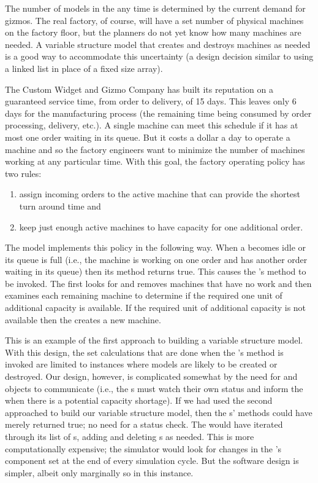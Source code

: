 The number of  models in the  any time is determined by the current demand for gizmos. The real factory, of course, will have a set number of physical machines on the factory floor, but the planners do not yet know how many machines are needed. A variable structure model that creates and destroys machines as needed is a good way to accommodate this uncertainty (a design decision similar to using a linked list in place of a fixed size array). 

The Custom Widget and Gizmo Company has built its reputation on a guaranteed service time, from order to delivery, of 15 days. This leaves only 6 days for the manufacturing process (the remaining time being consumed by order processing, delivery, etc.). 
A single machine can meet this schedule if it has at most one order waiting in its queue. But it costs a dollar a day to operate a machine and so the factory engineers want to minimize the number of machines working at any particular time. With this goal, the factory operating policy has two rules:
\begin{enumerate}
\item assign incoming orders to the active machine that can provide the shortest turn around time and
\item keep just enough active machines to have capacity for one additional order.
\end{enumerate}
The  model implements this policy in the following way. When a  becomes idle or its queue is full (i.e., the machine is working on one order and has another order waiting in its queue) then its  method returns true. This causes the 's  method to be invoked. The  first looks for and removes machines that have no work and then examines each remaining machine to determine if the required one unit of additional capacity is available. If the required unit of additional capacity is not available then the  creates a new machine.

This is an example of the first approach to building a variable structure model. With this design, the set calculations that are done when the 's  method is invoked are limited to instances where  models are likely to be created or destroyed. Our design, however, is complicated somewhat by the need for  and  objects to communicate (i.e., the s must watch their own status and inform the  when there is a potential capacity shortage). If we had used the second approached to build our variable structure model, then the s'  methods could have merely returned true; no need for a status check. The  would have iterated through its list of s, adding and deleting s as needed. This is more computationally expensive; the simulator would look for changes in the 's component set at the end of every simulation cycle. But the software design is simpler, albeit only marginally so in this instance.

